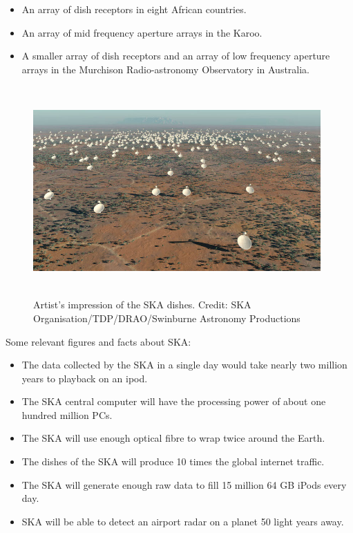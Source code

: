 \begin{itemize}
\item An array of dish receptors in eight African countries. 
\item An array of mid frequency aperture arrays in the Karoo. 
\item A smaller array of dish receptors and an array of low frequency aperture arrays in the Murchison Radio-astronomy Observatory in Australia.
\end{itemize}

 \begin{figure}[H]
 \centering
 \includegraphics[width=11cm,height=8cm]{images/ska.jpg}
 \caption{Artist's impression of the SKA dishes. Credit: SKA Organisation/TDP/DRAO/Swinburne Astronomy Productions}
 \end{figure}

Some relevant figures and facts about SKA:

\begin{itemize}

\item The data collected by the SKA in a single day would take nearly two million years to playback on an ipod.
\item The SKA central computer will have the processing power of about one hundred million PCs.
\item The SKA will use enough optical fibre to wrap twice around the Earth.
\item The dishes of the SKA will produce 10 times the global internet traffic.
\item The SKA will generate enough raw data to fill 15 million 64 GB iPods every day.
\item SKA will be able to detect an airport radar on a planet 50 light years away.

\end{itemize}




